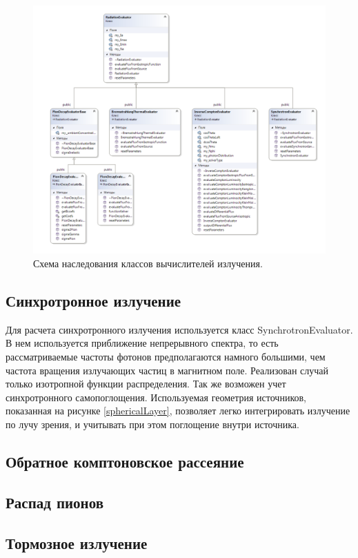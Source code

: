 \begin{figure}
	\centering
	\includegraphics[width=12.5 cm]{./fig/radiationEvaluator.png} 
	\caption{Схема наследования классов вычислителей излучения.}
	\label{radiationEvaluators}
\end{figure}

\subsection{Синхротронное излучение}
Для расчета синхротронного излучения используется класс SynchrotronEvaluator. В нем используется приближение непрерывного спектра, то есть рассматриваемые частоты фотонов предполагаются намного большими, чем частота вращения излучающих частиц в магнитном поле. Реализован случай только изотропной функции распределения. Так же возможен учет синхротронного самопоглощения. Используемая геометрия источников, показанная на рисунке \ref{sphericalLayer}, позволяет легко интегрировать излучение по лучу зрения, и учитывать при этом поглощение внутри источника.
\subsection{Обратное комптоновское рассеяние}
\subsection{Распад пионов}
\subsection{Тормозное излучение}

